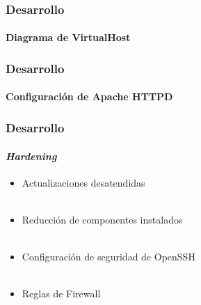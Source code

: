\documentclass{beamer}
\begin{document}

\begin{frame}
\frametitle{Desarrollo}
\framesubtitle{Diagrama de VirtualHost}
\centering
 {
  
 }

\end{frame}


\begin{frame}
\frametitle{Desarrollo}
\framesubtitle{Configuraci\'{o}n de Apache HTTPD}
\centering
 {
  
 }

\end{frame}


\begin{frame}
\frametitle{Desarrollo}
\framesubtitle{\textsl{Hardening}}
\justifying
\begin{itemize}
 \item Actualizaciones desatendidas
\\~\\
 \item Reducci\'{o}n de componentes instalados
\\~\\
 \item Configuraci\'{o}n de seguridad de OpenSSH
\\~\\
 \item Reglas de Firewall
\end{itemize}

\end{frame}

\end{document}
